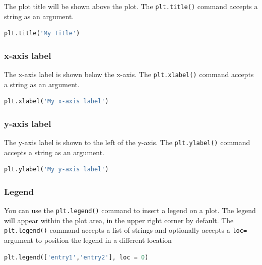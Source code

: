 \documentclass{book}
\begin{document}
The plot title will be shown above the plot. The \lstinline!plt.title()!
command accepts a string as an argument.

\begin{lstlisting}[language=Python]
plt.title('My Title')
\end{lstlisting}
    




    
        \subsubsection{x-axis label}\label{x-axis-label}

The x-axis label is shown below the x-axis. The \lstinline!plt.xlabel()!
command accepts a string as an argument.

\begin{lstlisting}[language=Python]
plt.xlabel('My x-axis label')
\end{lstlisting}
    




    
        \subsubsection{y-axis label}\label{y-axis-label}

The y-axis label is shown to the left of the y-axis. The
\lstinline!plt.ylabel()! command accepts a string as an argument.

\begin{lstlisting}[language=Python]
plt.ylabel('My y-axis label')
\end{lstlisting}
    




    
        \subsubsection{Legend}\label{legend}

You can use the \lstinline!plt.legend()! command to insert a legend on a
plot. The legend will appear within the plot area, in the upper right
corner by default. The \lstinline!plt.legend()! command accepts a list
of strings and optionally accepts a \lstinline!loc=! argument to
position the legend in a different location

\begin{lstlisting}[language=Python]
plt.legend(['entry1','entry2'], loc = 0)
\end{lstlisting}
\end{document}
